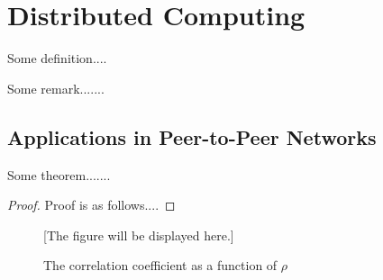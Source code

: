 \section{Distributed Computing}
\begin{definition}\label{abc6}
Some definition....
\end{definition}

\begin{remark}
Some remark.......
\end{remark}

\subsection{Applications in Peer-to-Peer Networks}

\begin{theorem}
Some theorem.......
\end{theorem}

\begin{proof}
Proof is as follows....
\end{proof}


\begin{figure}[h]

[The figure will be displayed here.]

\caption{The correlation coefficient as a function of $\rho$}
\end{figure}
